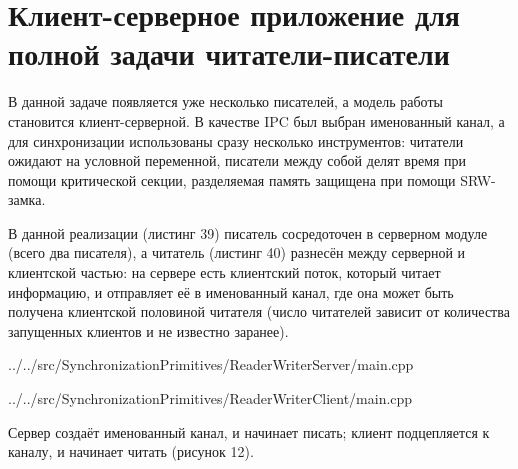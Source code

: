 \documentclass[a4paper, 12pt]{article}		%
\begin{document}
\newpage
\section{Клиент-серверное приложение для полной задачи читатели-писатели}

В данной задаче появляется уже несколько писателей, а модель работы становится клиент-серверной\cite{Dushutina}. В качестве IPC был выбран именованный канал, а для синхронизации использованы сразу несколько инструментов: читатели ожидают на условной переменной, писатели между собой делят время при помощи критической секции, разделяемая память защищена при помощи SRW-замка.

В данной реализации (листинг 39) писатель сосредоточен в серверном модуле (всего два писателя), а читатель (листинг 40) разнесён между серверной и клиентской частью: на сервере есть клиентский поток, который читает информацию, и отправляет её в именованный канал, где она может быть получена клиентской половиной читателя (число читателей зависит от количества запущенных клиентов и не известно заранее).


{../../src/SynchronizationPrimitives/ReaderWriterServer/main.cpp}



{../../src/SynchronizationPrimitives/ReaderWriterClient/main.cpp}

Сервер создаёт именованный канал, и начинает писать; клиент подцепляется к каналу, и начинает читать (рисунок 12).
\end{document}
